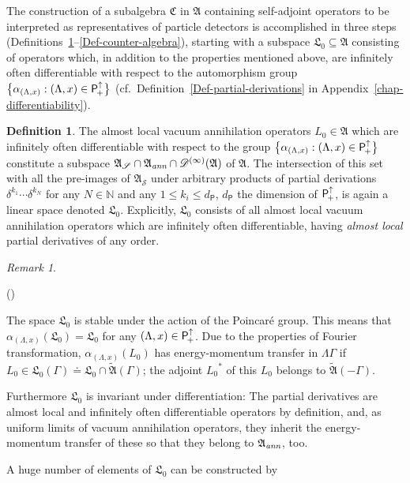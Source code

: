 \documentclass[11pt,twoside,openright]{report}
\theoremstyle{definition}
\newtheorem{Def}{Definition}[chapter]
\theoremstyle{plain}
\theoremstyle{remark}
\newtheorem*{Rem}{Remark}
\theoremstyle{assumption}
\newcommand{\bset}[1]{\bigl\{ #1 \bigr\}}
\newcommand{\Nbb}{\mathbb{N}}
\newcommand{\Afrak}{\mathfrak{A}}
\newcommand{\Cfrak}{\mathfrak{C}}
\newcommand{\Lfrak}{\mathfrak{L}}
\newcommand{\Dscr}{\mathscr{D}}
\newcommand{\Psf}{\mathsf{P}}
\newcommand{\AS}{\mathfrak{A}_{\mathscr{S}}}
\newcommand{\Aann}{\mathfrak{A}_{\text{\itshape ann}}}
\newcommand{\Poin}{\mathsf{P}_{\negthinspace +}^\uparrow}
\newcommand{\aLax}{\alpha_{( \Lambda , x )}}
\newcounter{remitem}
\newenvironment{remlist}{\begin{list}{(\roman{remitem})}%
  {\usecounter{remitem} \setlength{\topsep}{0ex}%
   \setlength{\parsep}{0.2ex} \setlength{\itemsep}{0.4ex}%
   \setlength{\leftmargin}{0em} \setlength{\itemindent}{0.5em}%
   }}{\end{list}}
\begin{document}
The construction of a subalgebra $\Cfrak$ in $\Afrak$ containing
self-adjoint operators to be interpreted as representatives of
particle detectors is accomplished in three steps
(Definitions~\ref{Def-annihilator-space}--\ref{Def-counter-algebra}),
starting with a subspace $\Lfrak_0 \subseteq \Afrak$ consisting of
operators which, in addition to the properties mentioned above, are
infinitely often differentiable with respect to the automorphism
group $\bset{\aLax : ( \Lambda , x ) \in \Poin}$
(cf.~Definition~\ref{Def-partial-derivations} in
Appendix~\ref{chap-differentiability}).
\begin{Def}
  \label{Def-annihilator-space}
  The almost local vacuum annihilation operators $L_0 \in \Afrak$
  which are infinitely often differentiable with respect to the
  group $\bset{\aLax : ( \Lambda , x ) \in \Poin}$ constitute a
  subspace $\AS \cap \Aann \cap \Dscr^{( \infty )} ( \Afrak )$ of
  $\Afrak$. The intersection of this set with all the pre-images of
  $\AS$ under arbitrary products of partial derivations $\delta^{k_1}
  \dotsm \delta^{k_N}$ for any $N \in \Nbb$ and any $1 \leqslant k_i
  \leqslant d_\Psf$, $d_\Psf$ the dimension of $\Poin$, is again a
  linear space denoted $\Lfrak_0$. Explicitly, $\Lfrak_0$ consists of
  all almost local vacuum annihilation operators which are infinitely
  often differentiable, having \emph{almost local} partial derivatives
  of any order.
\end{Def}
\begin{Rem}
  \begin{remlist}
  \item The space $\Lfrak_0$ is stable under the action of the
    Poincar\'{e} group. This means that $\aLax ( \Lfrak_0 ) =
    \Lfrak_0$ for any $( \Lambda , x) \in \Poin$. Due to the
    properties of Fourier transformation, $\aLax ( L_0 )$ has
    energy-momentum transfer in $\Lambda \Gamma$ if $L_0 \in \Lfrak_0
    ( \Gamma ) \doteq \Lfrak_0 \cap \widetilde{\Afrak} ( \Gamma )$;
    the adjoint ${L_0}^*$ of this $L_0$ belongs to $\widetilde{\Afrak}
    ( -\Gamma )$.
  \item Furthermore $\Lfrak_0$ is invariant under differentiation: The
    partial derivatives are almost local and infinitely often
    differentiable  operators by definition, and, as uniform limits of
    vacuum annihilation operators, they inherit the energy-momentum
    transfer of these so that they belong to $\Aann$, too.
  \end{remlist}
\end{Rem}
A huge number of elements of $\Lfrak_0$ can be constructed by
\end{document}
